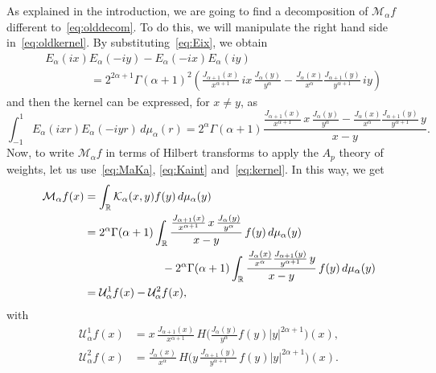 \documentclass[a4paper]{amsart}
\numberwithin{equation}{section}
\theoremstyle{plain}
\theoremstyle{remark}
\newcommand{\R}{\mathbb{R}}
\newcommand{\Ma}{\mathcal{M}_\alpha} %
\newcommand{\Ka}{\mathcal{K}_\alpha} %
\newcommand{\Ua}{\mathcal{U}_\alpha} %
\newcommand{\mua}{\mu_\alpha}
\begin{document}
As explained in the introduction, we are going to find a decomposition of $\Ma f$ different to~\eqref{eq:olddecom}.
To do this, we will manipulate the right hand side in~\eqref{eq:oldkernel}. 
By substituting~\eqref{eq:Eix}, we obtain 
\begin{align*}
  &E_{\alpha}(ix)E_{\alpha}(-iy)-E_{\alpha}(-ix)E_{\alpha}(iy) \\
  &\qquad\qquad
  = 2^{2\alpha+1} \Gamma(\alpha+1)^2 
  \left( \frac{J_{\alpha+1}(x)}{x^{\alpha+1}} \,ix\, \frac{J_{\alpha}(y)}{y^{\alpha}}
    - \frac{J_{\alpha}(x)}{x^{\alpha}} \frac{J_{\alpha+1}(y)}{y^{\alpha+1}} \,iy \right)
\end{align*}
and then the kernel can be expressed, for $x \ne y$, as
\begin{equation}
\label{eq:kernel}
  \int_{-1}^1 E_{\alpha}(ixr)E_{\alpha}(-iyr)\, d\mua(r)
  = 2^{\alpha} \Gamma(\alpha+1)
  \frac{ \frac{J_{\alpha+1}(x)}{x^{\alpha+1}} \,x\, \frac{J_{\alpha}(y)}{y^{\alpha}} 
    - \frac{ J_{\alpha}(x)}{x^{\alpha}} \frac{J_{\alpha+1}(y)}{y^{\alpha+1}} \,y }{x-y}.
\end{equation}
Now, to write $\Ma f$ in terms of Hilbert transforms to apply the $A_p$ theory of weights, 
let us use~\eqref{eq:MaKa}, \eqref{eq:Kaint} and~\eqref{eq:kernel}. In this way, we get 
\begin{align}
\label{eq:decom}
  \Ma f(x) &= \int_{\R} \Ka(x,y) f(y) \,d\mua(y) \\
  \notag
  &= 2^{\alpha} \Gamma(\alpha+1)
    \int_{\R} \frac{ \frac{J_{\alpha+1}(x)}{x^{\alpha+1}} \,x\, \frac{J_{\alpha}(y)}{y^{\alpha}} }{x-y}\, f(y) \,d\mua(y) \\
  \notag
  &\hspace{0.2\textwidth}\null- 2^{\alpha} \Gamma(\alpha+1)
    \int_{\R} \frac{ \frac{J_{\alpha}(x)}{x^{\alpha}} \frac{J_{\alpha+1}(y)}{y^{\alpha+1}} \,y }{x-y}\, f(y) \,d\mua(y) \\
  \notag
  &= \Ua^1 f(x) - \Ua^2 f(x), \notag
\end{align}
with
\begin{align*}
  \Ua^1 f(x)
  &= x \, \frac{J_{\alpha+1}(x)}{x^{\alpha+1}} \, H\bigg( \frac{J_{\alpha}(y)}{y^{\alpha}} f(y) |y|^{2\alpha+1}\bigg)(x), \\
  \Ua^2 f(x)
  &= \frac{J_{\alpha}(x)}{x^{\alpha}} \, H\bigg( y\, \frac{J_{\alpha+1}(y)}{y^{\alpha+1}} \, f(y) |y|^{2\alpha+1}\bigg)(x).
\end{align*}
\end{document}
